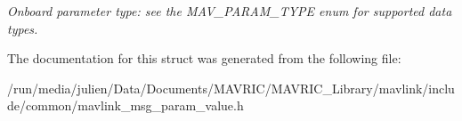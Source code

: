 \begin{DoxyCompactItemize}
\begin{DoxyCompactList}\small\item\em Onboard parameter type\+: see the M\+A\+V\+\_\+\+P\+A\+R\+A\+M\+\_\+\+T\+Y\+P\+E enum for supported data types. \end{DoxyCompactList}\end{DoxyCompactItemize}


The documentation for this struct was generated from the following file\+:\begin{DoxyCompactItemize}
\item 
/run/media/julien/\+Data/\+Documents/\+M\+A\+V\+R\+I\+C/\+M\+A\+V\+R\+I\+C\+\_\+\+Library/mavlink/include/common/mavlink\+\_\+msg\+\_\+param\+\_\+value.\+h\end{DoxyCompactItemize}
